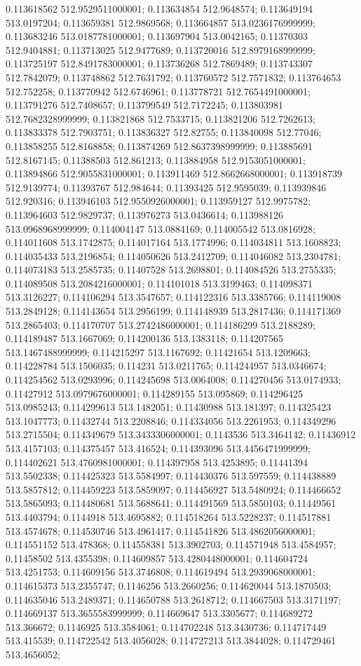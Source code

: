 0.113618562 512.9529511000001; 0.113634854 512.9648574; 0.113649194 513.0197204; 0.113659381 512.9869568; 0.113664857 513.0236176999999; 0.113683246 513.0187781000001; 0.113697904 513.0042165; 0.11370303 512.9404881; 0.113713025 512.9477689; 0.113720016 512.8979168999999; 0.113725197 512.8491783000001; 0.113736268 512.7869489; 0.113743307 512.7842079; 0.113748862 512.7631792; 0.113760572 512.7571832; 0.113764653 512.752258; 0.113770942 512.6746961; 0.113778721 512.7654491000001; 0.113791276 512.7408657; 0.113799549 512.7172245; 0.113803981 512.7682328999999; 0.113821868 512.7533715; 0.113821206 512.7262613; 0.113833378 512.7903751; 0.113836327 512.82755; 0.113840098 512.77046; 0.113858255 512.8168858; 0.113874269 512.8637398999999; 0.113885691 512.8167145; 0.11388503 512.861213; 0.113884958 512.9153051000001; 0.113894866 512.9055831000001; 0.113911469 512.8662668000001; 0.113918739 512.9139774; 0.11393767 512.984644; 0.11393425 512.9595039; 0.113939846 512.920316; 0.113946103 512.9550926000001; 0.113959127 512.9975782; 0.113964603 512.9829737; 0.113976273 513.0436614; 0.113988126 513.0968968999999; 0.114004147 513.0884169; 0.114005542 513.0816928; 0.114011608 513.1742875; 0.114017164 513.1774996; 0.114034811 513.1608823; 0.114035433 513.2196854; 0.114050626 513.2412709; 0.114046082 513.2304781; 0.114073183 513.2585735; 0.11407528 513.2698801; 0.114084526 513.2755335; 0.114089508 513.2084216000001; 0.114101018 513.3199463; 0.114098371 513.3126227; 0.114106294 513.3547657; 0.114122316 513.3385766; 0.114119008 513.2849128; 0.114143654 513.2956199; 0.114148939 513.2817436; 0.114171369 513.2865403; 0.114170707 513.2742486000001; 0.114186299 513.2188289; 0.114189487 513.1667069; 0.114200136 513.1383118; 0.114207565 513.1467488999999; 0.114215297 513.1167692; 0.11421654 513.1209663; 0.114228784 513.1506035; 0.114231 513.0211765; 0.114244957 513.0346674; 0.114254562 513.0293996; 0.114245698 513.0064008; 0.114270456 513.0174933; 0.11427912 513.0979676000001; 0.114289155 513.095869; 0.114296425 513.0985243; 0.114299613 513.1482051; 0.11430988 513.181397; 0.114325423 513.1047773; 0.11432744 513.2208846; 0.114334056 513.2261953; 0.114349296 513.2715504; 0.114349679 513.3433306000001; 0.1143536 513.3464142; 0.11436912 513.4157103; 0.114375457 513.416524; 0.114393096 513.4456471999999; 0.114402621 513.4760981000001; 0.114397958 513.4253895; 0.11441394 513.5502338; 0.114425323 513.5584997; 0.114430376 513.597559; 0.114438889 513.5857812; 0.114459223 513.5859097; 0.114456927 513.5480924; 0.114466652 513.5865093; 0.114480681 513.5688641; 0.114491569 513.5850103; 0.11449561 513.4403794; 0.1144918 513.4695882; 0.114518264 513.5228237; 0.114517881 513.4574678; 0.114530746 513.4961417; 0.114541826 513.4862056000001; 0.114551152 513.478368; 0.114558381 513.3902703; 0.114571948 513.4584957; 0.11458502 513.4355398; 0.114609857 513.4280448000001; 0.114604724 513.4251753; 0.114609156 513.3746808; 0.114619494 513.2939068000001; 0.114615373 513.2355747; 0.1146256 513.2660256; 0.114620044 513.1870503; 0.114635046 513.2489371; 0.114650788 513.2618712; 0.114667503 513.3171197; 0.114669137 513.3655583999999; 0.114669647 513.3305677; 0.114689272 513.366672; 0.1146925 513.3584061; 0.114702248 513.3430736; 0.114717449 513.415539; 0.114722542 513.4056028; 0.114727213 513.3844028; 0.114729461 513.4656052; 